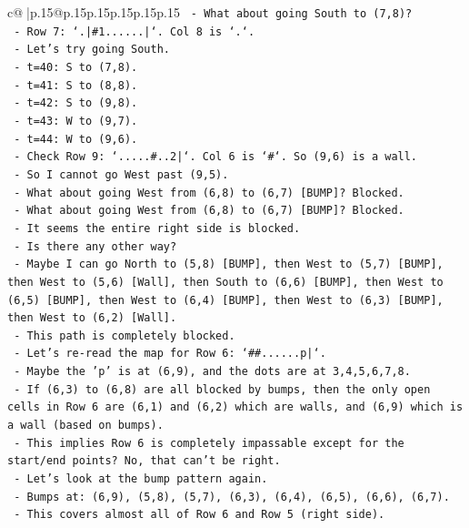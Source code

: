 \documentclass{article}
\begin{document}
{\begin{supertabular}{c@{$\;$}|p{.15\linewidth}@{}p{.15\linewidth}p{.15\linewidth}p{.15\linewidth}p{.15\linewidth}p{.15\linewidth}}
{{{\texttt{  {-} What about going South to (7,8)?} \\
\texttt{  {-} Row 7: `.|\#1......|`. Col 8 is `.`.} \\
\texttt{  {-} Let's try going South.} \\
\texttt{  {-} t=40: S to (7,8).} \\
\texttt{  {-} t=41: S to (8,8).} \\
\texttt{  {-} t=42: S to (9,8).} \\
\texttt{  {-} t=43: W to (9,7).} \\
\texttt{  {-} t=44: W to (9,6).} \\
\texttt{  {-} Check Row 9: `.....\#..2|`. Col 6 is `\#`. So (9,6) is a wall.} \\
\texttt{  {-} So I cannot go West past (9,5).} \\
\texttt{  {-} What about going West from (6,8) to (6,7) {[}BUMP{]}? Blocked.} \\
\texttt{  {-} What about going West from (6,8) to (6,7) {[}BUMP{]}? Blocked.} \\
\texttt{  {-} It seems the entire right side is blocked.} \\
\texttt{  {-} Is there any other way?} \\
\texttt{  {-} Maybe I can go North to (5,8) {[}BUMP{]}, then West to (5,7) {[}BUMP{]}, then West to (5,6) {[}Wall{]}, then South to (6,6) {[}BUMP{]}, then West to (6,5) {[}BUMP{]}, then West to (6,4) {[}BUMP{]}, then West to (6,3) {[}BUMP{]}, then West to (6,2) {[}Wall{]}.} \\
\texttt{  {-} This path is completely blocked.} \\
\texttt{  {-} Let's re{-}read the map for Row 6: `\#\#......p|`.} \\
\texttt{  {-} Maybe the 'p' is at (6,9), and the dots are at 3,4,5,6,7,8.} \\
\texttt{  {-} If (6,3) to (6,8) are all blocked by bumps, then the only open cells in Row 6 are (6,1) and (6,2) which are walls, and (6,9) which is a wall (based on bumps).} \\
\texttt{  {-} This implies Row 6 is completely impassable except for the start/end points? No, that can't be right.} \\
\texttt{  {-} Let's look at the bump pattern again.} \\
\texttt{  {-} Bumps at: (6,9), (5,8), (5,7), (6,3), (6,4), (6,5), (6,6), (6,7).} \\
\texttt{  {-} This covers almost all of Row 6 and Row 5 (right side).} \\
}}}
\end{supertabular}}
\end{document}
